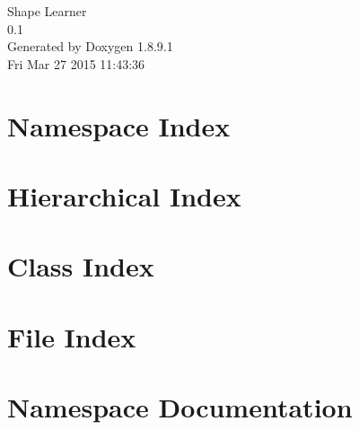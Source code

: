 \documentclass[twoside]{book}
\newcommand{\+}{\discretionary{\mbox{\scriptsize$\hookleftarrow$}}{}{}}
\newcommand{\clearemptydoublepage}{%
  \newpage{\pagestyle{empty}\cleardoublepage}%
}
\begin{document}
\hypersetup{pageanchor=false,
             bookmarks=true,
             bookmarksnumbered=true,
             pdfencoding=unicode
            }
\begin{titlepage}
\vspace*{7cm}
\begin{center}%
{\Large Shape Learner \\[1ex]\large 0.\+1 }\\
\vspace*{1cm}
{\large Generated by Doxygen 1.8.9.1}\\
\vspace*{0.5cm}
{\small Fri Mar 27 2015 11:43:36}\\
\end{center}
\end{titlepage}
\clearemptydoublepage
\tableofcontents
\clearemptydoublepage
{}
\hypersetup{pageanchor=true}

\chapter{Namespace Index}

\chapter{Hierarchical Index}

\chapter{Class Index}

\chapter{File Index}

\chapter{Namespace Documentation}




\end{document}
